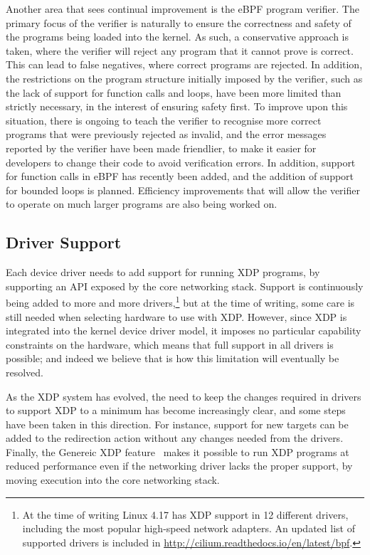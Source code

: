 \documentclass[10pt,sigconf,anonymous]{acmart}
\begin{document}
Another area that sees continual improvement is the eBPF program verifier. The
primary focus of the verifier is naturally to ensure the correctness and safety
of the programs being loaded into the kernel. As such, a conservative approach
is taken, where the verifier will reject any program that it cannot prove is
correct. This can lead to false negatives, where correct programs are rejected.
In addition, the restrictions on the program structure initially imposed by the
verifier, such as the lack of support for function calls and loops, have been
more limited than strictly necessary, in the interest of ensuring safety first.
To improve upon this situation, there is ongoing to teach the verifier to
recognise more correct programs that were previously rejected as invalid, and
the error messages reported by the verifier have been made friendlier, to make
it easier for developers to change their code to avoid verification errors. In
addition, support for function calls in eBPF has recently been added, and the
addition of support for bounded loops is planned. Efficiency improvements that
will allow the verifier to operate on much larger programs are also being worked
on.

\subsection{Driver Support}
\label{sec:driver-support}
Each device driver needs to add support for running XDP programs, by supporting
an API exposed by the core networking stack. Support is continuously being added
to more and more drivers,\footnote{At the time of writing Linux 4.17 has XDP
  support in 12 different drivers, including the most popular high-speed network
  adapters. An updated list of supported drivers is included in
  \url{http://cilium.readthedocs.io/en/latest/bpf}.} but at the time of writing,
some care is still needed when selecting hardware to use with XDP. However,
since XDP is integrated into the kernel device driver model, it imposes no
particular capability constraints on the hardware, which means that full support
in all drivers is possible; and indeed we believe that is how this limitation
will eventually be resolved.

As the XDP system has evolved, the need to keep the changes required in drivers
to support XDP to a minimum has become increasingly clear, and some steps have
been taken in this direction. For instance, support for new targets can be added
to the redirection action without any changes needed from the drivers. Finally,
the Genereic XDP feature~\cite{generic-xdp} makes it possible to run XDP
programs at reduced performance even if the networking driver lacks the proper
support, by moving execution into the core networking stack.
\end{document}
